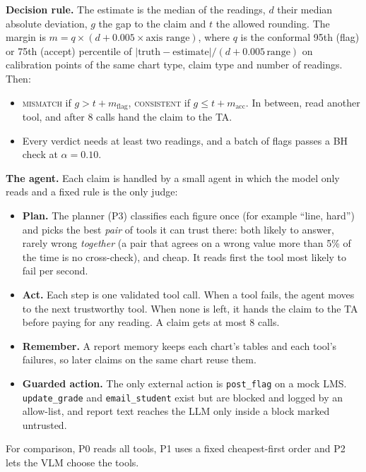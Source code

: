 \documentclass[11pt,a4paper]{article}
\newcommand{\code}[1]{\texttt{\small #1}}
\begin{document}
\textbf{Decision rule.} The estimate is the median of the readings, $d$ their median absolute deviation, $g$ the gap to the claim and $t$ the allowed rounding. The margin is $m = q \times (d + 0.005 \times \text{axis range})$, where $q$ is the conformal 95th (flag) or 75th (accept) percentile of $|\text{truth}-\text{estimate}|/(d + 0.005\,\text{range})$ on calibration points of the same chart type, claim type and number of readings. Then:
\begin{itemize}
\item \textsc{mismatch} if $g > t + m_{\text{flag}}$, \textsc{consistent} if $g \le t + m_{\text{acc}}$. In between, read another tool, and after 8 calls hand the claim to the TA.
\item Every verdict needs at least two readings, and a batch of flags passes a BH check at $\alpha = 0.10$.
\end{itemize}

\textbf{The agent.} Each claim is handled by a small agent in which the model only reads and a fixed rule is the only judge:
\begin{itemize}
\item \textbf{Plan.} The planner (P3) classifies each figure once (for example ``line, hard'') and picks the best \emph{pair} of tools it can trust there: both likely to answer, rarely wrong \emph{together} (a pair that agrees on a wrong value more than 5\% of the time is no cross-check), and cheap. It reads first the tool most likely to fail per second.
\item \textbf{Act.} Each step is one validated tool call. When a tool fails, the agent moves to the next trustworthy tool. When none is left, it hands the claim to the TA before paying for any reading. A claim gets at most 8 calls.
\item \textbf{Remember.} A report memory keeps each chart's tables and each tool's failures, so later claims on the same chart reuse them.
\item \textbf{Guarded action.} The only external action is \code{post\_flag} on a mock LMS. \code{update\_grade} and \code{email\_student} exist but are blocked and logged by an allow-list, and report text reaches the LLM only inside a block marked untrusted.
\end{itemize}
For comparison, P0 reads all tools, P1 uses a fixed cheapest-first order and P2 lets the VLM choose the tools.
\end{document}

